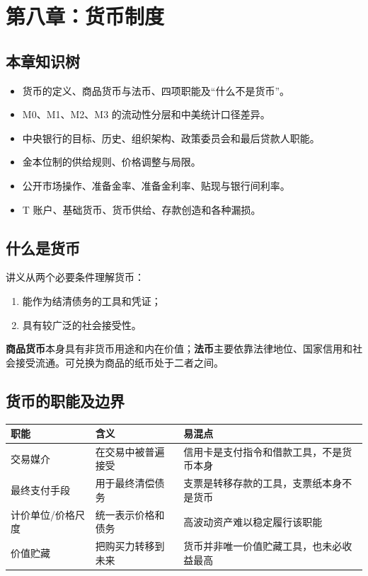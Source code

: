 \documentclass[UTF8,11pt,a4paper]{ctexart}
\newcommand{\term}[1]{\textbf{#1}}
\begin{document}
\newpage
\section{第八章：货币制度}

\subsection{本章知识树}
\begin{itemize}
  \item 货币的定义、商品货币与法币、四项职能及“什么不是货币”。
  \item M0、M1、M2、M3 的流动性分层和中美统计口径差异。
  \item 中央银行的目标、历史、组织架构、政策委员会和最后贷款人职能。
  \item 金本位制的供给规则、价格调整与局限。
  \item 公开市场操作、准备金率、准备金利率、贴现与银行间利率。
  \item T 账户、基础货币、货币供给、存款创造和各种漏损。
\end{itemize}

\subsection{什么是货币}
讲义从两个必要条件理解货币：
\begin{enumerate}
  \item 能作为结清债务的工具和凭证；
  \item 具有较广泛的社会接受性。
\end{enumerate}
\term{商品货币}本身具有非货币用途和内在价值；\term{法币}主要依靠法律地位、国家信用和社会接受流通。可兑换为商品的纸币处于二者之间。

\subsection{货币的职能及边界}
\begin{longtable}{p{}p{}p{}}
\toprule
职能 & 含义 & 易混点\\
\midrule
交易媒介 & 在交易中被普遍接受 & 信用卡是支付指令和借款工具，不是货币本身\\
最终支付手段 & 用于最终清偿债务 & 支票是转移存款的工具，支票纸本身不是货币\\
计价单位/价格尺度 & 统一表示价格和债务 & 高波动资产难以稳定履行该职能\\
价值贮藏 & 把购买力转移到未来 & 货币并非唯一价值贮藏工具，也未必收益最高\\
\bottomrule
\end{longtable}
\end{document}
